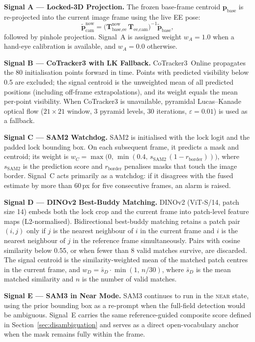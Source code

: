 \documentclass[lettersize,journal]{IEEEtran}
\begin{document}
\textbf{Signal A --- Locked-3D Projection.}
The frozen base-frame centroid $\mathbf{p}_{\text{base}}$ is re-projected
into the current image frame using the live EE pose:
\begin{equation}
  \tilde{\mathbf{p}}_{\text{cam}}^{\text{now}}
  = \bigl(\mathbf{T}_{\text{base,ee}}^{\text{now}}\,
           \mathbf{T}_{\text{ee,cam}}\bigr)^{-1}
    \tilde{\mathbf{p}}_{\text{base}},
\end{equation}
followed by pinhole projection. Signal~A is assigned weight $w_A = 1.0$
when a hand-eye calibration is available, and $w_A = 0.0$ otherwise.

\textbf{Signal B --- CoTracker3 with LK Fallback.}
CoTracker3~Online propagates the 80 initialisation points forward in time.
Points with predicted visibility below 0.5 are excluded; the signal centroid
is the unweighted mean of all predicted positions (including off-frame
extrapolations), and its weight equals the mean per-point visibility.
When CoTracker3 is unavailable, pyramidal Lucas--Kanade optical flow
($21\times21$ window, 3 pyramid levels, 30 iterations,
$\varepsilon = 0.01$) is used as a fallback.

\textbf{Signal C --- SAM2 Watchdog.}
SAM2 is initialised with the lock logit and the padded lock bounding box.
On each subsequent frame, it predicts a mask and centroid; its weight is
$w_C = \max\bigl(0,\,\min(0.4,\,s_{\text{SAM2}}\,(1 - r_{\text{border}}))
\bigr)$,
where $s_{\text{SAM2}}$ is the prediction score and $r_{\text{border}}$
penalises masks that touch the image border. Signal~C acts primarily as a
watchdog: if it disagrees with the fused estimate by more than 60\,px for
five consecutive frames, an alarm is raised.

\textbf{Signal D --- DINOv2 Best-Buddy Matching.}
DINOv2 (ViT-S/14, patch size 14) embeds both the lock crop and the current
frame into patch-level feature maps (L2-normalised). Bidirectional
best-buddy matching retains a patch pair $(i,j)$ only if $j$ is the nearest
neighbour of $i$ in the current frame and $i$ is the nearest neighbour of
$j$ in the reference frame simultaneously. Pairs with cosine similarity
below 0.55, or when fewer than 8 valid matches survive, are discarded.
The signal centroid is the similarity-weighted mean of the matched patch
centres in the current frame, and $w_D = \bar{s}_D \cdot \min(1,\,n/30)$,
where $\bar{s}_D$ is the mean matched similarity and $n$ is the number of
valid matches.

\textbf{Signal E --- SAM3 in Near Mode.}
SAM3 continues to run in the \textsc{near} state, using the prior bounding
box as a re-prompt when the full-field detection would be ambiguous.
Signal~E carries the same reference-guided composite score defined in
Section~\ref{sec:disambiguation} and serves as a direct open-vocabulary
anchor when the mask remains fully within the frame.
\end{document}
